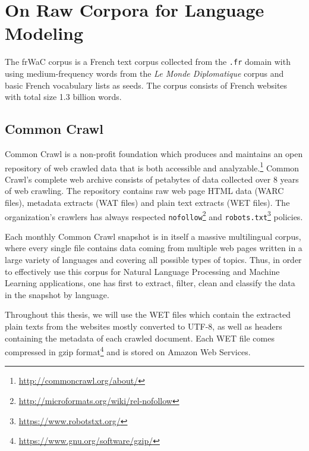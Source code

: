 \chapter{On Raw Corpora for Language Modeling}

The frWaC corpus is a French text corpus collected from the \texttt{.fr} domain with using medium-frequency words from the \emph{Le Monde Diplomatique} corpus and basic French vocabulary lists as seeds. The corpus consists of French websites with total size 1.3 billion words.

\section{Common Crawl}

Common Crawl is a non-profit foundation which produces and maintains an open repository of web crawled data that is both accessible and analyzable.\footnote{\url{http://commoncrawl.org/about/}} Common Crawl's complete web archive consists of petabytes of data collected over 8 years of web crawling. The repository contains raw web page HTML data (WARC files), metadata extracts (WAT files) and plain text extracts (WET files). The organization's crawlers has always respected \texttt{nofollow}\footnote{\url{http://microformats.org/wiki/rel-nofollow}} and \texttt{robots.txt}\footnote{\url{https://www.robotstxt.org/}} policies.

Each monthly Common Crawl snapshot is in itself a massive multilingual corpus, where every single file contains data coming from multiple web pages written in a large variety of languages and covering all possible types of topics. Thus, in order to effectively use this corpus for Natural Language Processing and Machine Learning applications, one has first to extract, filter, clean and classify the data in the snapshot by language.

Throughout this thesis, we will use the WET files which contain the extracted plain texts from the websites mostly converted to UTF-8, as well as headers containing the metadata of each crawled document. Each WET file comes compressed in gzip format\footnote{\url{https://www.gnu.org/software/gzip/}} and is stored on Amazon Web Services.

